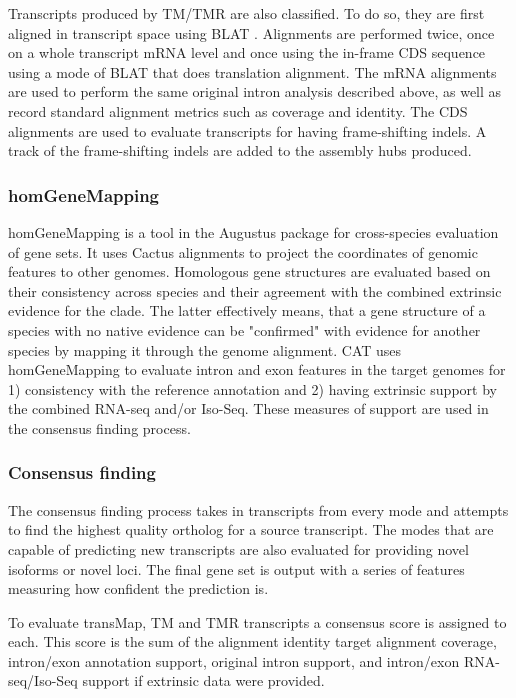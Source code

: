 	Transcripts produced by TM/TMR are also classified. To do so, they are first aligned in transcript space using BLAT  \citep{kent2002blat}. Alignments are performed twice, once on a whole transcript mRNA level and once using the in-frame CDS sequence using a mode of BLAT that does translation alignment. The mRNA alignments are used to perform the same original intron analysis described above, as well as record standard alignment metrics such as coverage and identity. The CDS alignments are used to evaluate transcripts for having frame-shifting indels. A track of the frame-shifting indels are added to the assembly hubs produced.

\subsubsection*{homGeneMapping}
	homGeneMapping is a tool in the Augustus package for cross-species evaluation of gene sets. It uses Cactus alignments to project the coordinates of genomic features to other genomes. Homologous gene structures are evaluated based on their consistency across species and their agreement with the combined extrinsic evidence for the clade. The latter effectively means, that a gene structure of a species with no native evidence can be "confirmed" with evidence for another species by mapping it through the genome alignment. CAT uses homGeneMapping to evaluate intron and exon features in the target genomes for 1) consistency with the reference annotation and 2) having extrinsic support by the combined RNA-seq and/or Iso-Seq. These measures of support are used in the consensus finding process.

\subsubsection*{Consensus finding}
	The consensus finding process takes in transcripts from every mode and attempts to find the highest quality ortholog for a source transcript. The modes that are capable of predicting new transcripts are also evaluated for providing novel isoforms or novel loci. The final gene set is output with a series of features measuring how confident the prediction is.
  
	To evaluate transMap, TM and TMR transcripts a consensus score is assigned to each. This score is the sum of the alignment identity target alignment coverage, intron/exon annotation support, original intron support, and intron/exon RNA-seq/Iso-Seq support if extrinsic data were provided.
  
